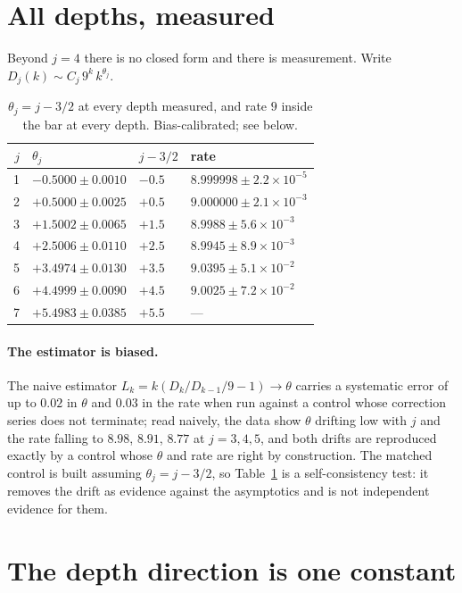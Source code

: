 \documentclass[11pt]{article}
\begin{document}
\section{All depths, measured}
\label{sec:allj}

Beyond $j = 4$ there is no closed form and there is measurement. Write
$D_j(k) \sim C_j\,9^k\,k^{\theta_j}$.

\begin{table}[H]
\centering\small
\begin{tabular}{r l l l}
\toprule
$j$ & $\theta_j$ & $j - 3/2$ & rate \\
\midrule
1 & $-0.5000 \pm 0.0010$ & $-0.5$ & $8.999998 \pm 2.2\times10^{-5}$ \\
2 & $+0.5000 \pm 0.0025$ & $+0.5$ & $9.000000 \pm 2.1\times10^{-3}$ \\
3 & $+1.5002 \pm 0.0065$ & $+1.5$ & $8.9988 \pm 5.6\times10^{-3}$ \\
4 & $+2.5006 \pm 0.0110$ & $+2.5$ & $8.9945 \pm 8.9\times10^{-3}$ \\
5 & $+3.4974 \pm 0.0130$ & $+3.5$ & $9.0395 \pm 5.1\times10^{-2}$ \\
6 & $+4.4999 \pm 0.0090$ & $+4.5$ & $9.0025 \pm 7.2\times10^{-2}$ \\
7 & $+5.4983 \pm 0.0385$ & $+5.5$ & --- \\
\bottomrule
\end{tabular}
\caption{$\theta_j = j - 3/2$ at every depth measured, and rate $9$ inside the
bar at every depth. Bias-calibrated; see below.}
\label{tab:thetas}
\end{table}

\paragraph{The estimator is biased.} The naive estimator
$L_k = k(D_k/D_{k-1}/9 - 1) \to \theta$ carries a systematic error of up to
$0.02$ in $\theta$ and $0.03$ in the rate when run against a control whose
correction series does not terminate; read naively, the data show $\theta$
drifting low with $j$ and the rate falling to $8.98$, $8.91$, $8.77$ at
$j = 3,4,5$, and both drifts are reproduced exactly by a control whose $\theta$
and rate are right by construction. The matched control is built assuming
$\theta_j = j - 3/2$, so Table~\ref{tab:thetas} is a self-consistency test: it
removes the drift as evidence against the asymptotics and is not independent
evidence for them.

\section{The depth direction is one constant}
\label{sec:ridge}
\end{document}
